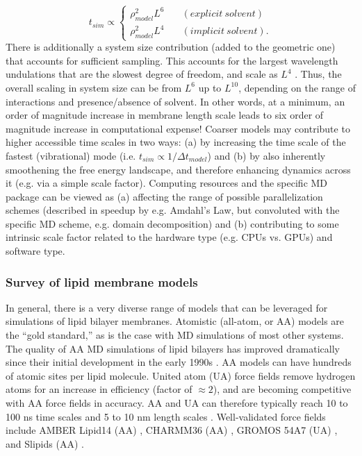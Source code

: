 \documentclass[9pt,bestpractices]{livecoms}
\begin{document}
\begin{equation}\label{eq:14}
	t_{sim} \propto \left\{
       		 \begin{array}{ll}
            		\rho_{model}^2 L^6 & \quad (explicit \: solvent) \\
            		\rho_{model}^2 L^4 & \quad (implicit \: solvent).
        		\end{array}
    	\right.
\end{equation}
There is additionally a system size contribution (added to the geometric one) that accounts for sufficient sampling.
This accounts for the largest wavelength undulations that are the slowest degree of freedom, and scale as $L^4$ \cite{Watson2010a}.
Thus, the overall scaling in system size can be from $L^6$ up to $L^{10}$, depending on the range of interactions and presence/absence of solvent.
In other words, at a minimum, an order of magnitude increase in membrane length scale leads to six order of magnitude increase in computational expense!
Coarser models may contribute to higher accessible time scales in two ways: (a) by increasing the time scale of the fastest (vibrational) mode (i.e. $t_{sim} \propto 1/\Delta t_{model}$) and (b) by also inherently smoothening the free energy landscape, and therefore enhancing dynamics across it (e.g. via a simple scale factor).
Computing resources and the specific MD package can be viewed as (a) affecting the range of possible parallelization schemes (described in speedup by e.g. Amdahl's Law, but convoluted with the specific MD scheme, e.g. domain decomposition) and (b) contributing to some intrinsic scale factor related to the hardware type (e.g. CPUs vs. GPUs) and software type.

\subsubsection{Survey of lipid membrane models}
\label{subsubsec:modelsurvey}
In general, there is a very diverse range of models that can be leveraged for simulations of lipid bilayer membranes.
Atomistic (all-atom, or AA) models are the ``gold standard,'' as is the case with MD simulations of most other systems.
The quality of AA MD simulations of lipid bilayers has improved dramatically since their initial development in the early 1990s \cite{Venable2015}.
AA models can have hundreds of atomic sites per lipid molecule.
United atom (UA) force fields remove hydrogen atoms for an increase in efficiency (factor of $\approx 2$), and are becoming competitive with AA force fields in accuracy.
AA and UA can therefore typically reach 10 to 100 ns time scales and 5 to 10 nm length scales \cite{Smirnova2015}.
Well-validated force fields include AMBER Lipid14 (AA) \cite{Dickson2014}, CHARMM36 (AA) \cite{Klauda2010d}, GROMOS 54A7 (UA) \cite{Poger2010a}, and Slipids (AA) \cite{Jambeck2012}.
\end{document}
